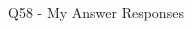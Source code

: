 \begin{frame}{Q58 - My Answer Responses}
\begin{multicols}{2}
    \begin{minipage}{\linewidth}
    \RaggedRight\textbf{\tiny {}} \\ 
    \vspace{4.00pt}
    \end{minipage}
    \vspace{10pt}

    \end{multicols}
\end{frame}


